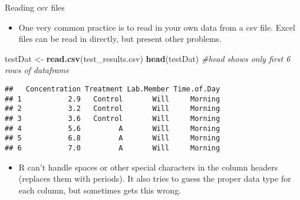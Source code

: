 \documentclass[
  ignorenonframetext,
  aspectratio=169]{beamer}
\newenvironment{Shaded}{\begin{snugshade}}{\end{snugshade}}
\newcommand{\CommentTok}[1]{\textcolor[rgb]{0.56,0.35,0.01}{\textit{#1}}}
\newcommand{\FunctionTok}[1]{\textcolor[rgb]{0.13,0.29,0.53}{\textbf{#1}}}
\newcommand{\NormalTok}[1]{#1}
\newcommand{\OtherTok}[1]{\textcolor[rgb]{0.56,0.35,0.01}{#1}}
\newcommand{\StringTok}[1]{\textcolor[rgb]{0.31,0.60,0.02}{#1}}
\providecommand{\tightlist}{%
  \setlength{\itemsep}{0pt}\setlength{\parskip}{0pt}}
\begin{document}
\begin{frame}[fragile]{Reading csv files}
\protect\hypertarget{reading-csv-files}{}
\begin{itemize}[<+->]
\tightlist
\item
  One very common practice is to read in your own data from a csv file.
  Excel files can be read in directly, but present other problems.
\end{itemize}

\footnotesize

\begin{Shaded}
\begin{Highlighting}[]
\NormalTok{testDat }\OtherTok{\textless{}{-}} \FunctionTok{read.csv}\NormalTok{(}\StringTok{\textquotesingle{}test\_results.csv\textquotesingle{}}\NormalTok{)}
\FunctionTok{head}\NormalTok{(testDat) }\CommentTok{\#head shows only first 6 rows of dataframe}
\end{Highlighting}
\end{Shaded}

\begin{verbatim}
##   Concentration Treatment Lab.Member Time.of.Day
## 1           2.9   Control       Will     Morning
## 2           3.2   Control       Will     Morning
## 3           3.6   Control       Will     Morning
## 4           5.6         A       Will     Morning
## 5           6.8         A       Will     Morning
## 6           7.0         A       Will     Morning
\end{verbatim}

\normalsize

\begin{itemize}[<+->]
\tightlist
\item
  R can't handle spaces or other special characters in the column
  headers (replaces them with periods). It also tries to guess the
  proper data type for each column, but sometimes gets this wrong.
\end{itemize}
\end{frame}
\end{document}
